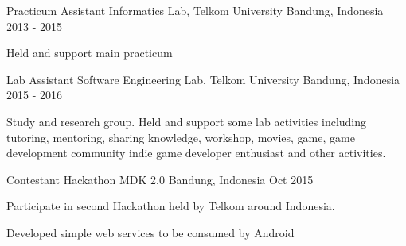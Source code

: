 \begin{cventries}

\cventry
    {Practicum Assistant}
    {Informatics Lab, Telkom University}
    {Bandung, Indonesia}
    {2013 - 2015}
    {
        \begin{cvitems}
            \item {Held and support main practicum}
        \end{cvitems}
    }

\cventry
    {Lab Assistant}
    {Software Engineering Lab, Telkom University}
    {Bandung, Indonesia}
    {2015 - 2016}
    {
        \begin{cvitems}
            \item {Study and research group. Held and support some lab activities including tutoring, mentoring, sharing knowledge, workshop, movies, game, game development community indie game developer enthusiast and other activities.}
        \end{cvitems}
    }

\cventry
    {Contestant}
    {Hackathon MDK 2.0}
    {Bandung, Indonesia}
    {Oct 2015}
    {
        \begin{cvitems}
            \item {Participate in second Hackathon held by Telkom around Indonesia.}
            \item {Developed simple web services to be consumed by Android}
        \end{cvitems}
    }

\end{cventries}
